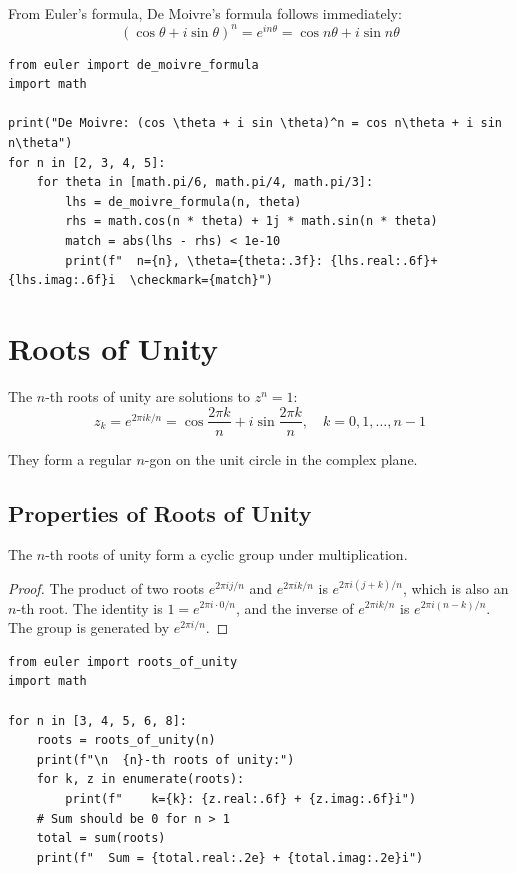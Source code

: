 From Euler's formula, De Moivre's formula follows immediately:
\[
(\cos \theta + i \sin \theta)^n = e^{in\theta} = \cos n\theta + i \sin n\theta
\]

\begin{lstlisting}[caption={De Moivre's formula}, label=lst:demoivre]
from euler import de_moivre_formula
import math

print("De Moivre: (cos \theta + i sin \theta)^n = cos n\theta + i sin n\theta")
for n in [2, 3, 4, 5]:
    for theta in [math.pi/6, math.pi/4, math.pi/3]:
        lhs = de_moivre_formula(n, theta)
        rhs = math.cos(n * theta) + 1j * math.sin(n * theta)
        match = abs(lhs - rhs) < 1e-10
        print(f"  n={n}, \theta={theta:.3f}: {lhs.real:.6f}+{lhs.imag:.6f}i  \checkmark={match}")
\end{lstlisting}

\section{Roots of Unity}

The $n$-th roots of unity are solutions to $z^n = 1$:
\[
z_k = e^{2\pi i k / n} = \cos \frac{2\pi k}{n} + i \sin \frac{2\pi k}{n}, \quad k = 0, 1, \ldots, n-1
\]

They form a regular $n$-gon on the unit circle in the complex plane.

\subsection{Properties of Roots of Unity}

\begin{theorem}
The $n$-th roots of unity form a cyclic group under multiplication.
\end{theorem}

\begin{proof}
The product of two roots $e^{2\pi i j/n}$ and $e^{2\pi i k/n}$ is $e^{2\pi i (j+k)/n}$,
which is also an $n$-th root. The identity is $1 = e^{2\pi i \cdot 0/n}$, and the inverse
of $e^{2\pi i k/n}$ is $e^{2\pi i (n-k)/n}$. The group is generated by $e^{2\pi i/n}$.
\end{proof}

\begin{lstlisting}[caption={Roots of unity}, label=lst:roots_unity]
from euler import roots_of_unity
import math

for n in [3, 4, 5, 6, 8]:
    roots = roots_of_unity(n)
    print(f"\n  {n}-th roots of unity:")
    for k, z in enumerate(roots):
        print(f"    k={k}: {z.real:.6f} + {z.imag:.6f}i")
    # Sum should be 0 for n > 1
    total = sum(roots)
    print(f"  Sum = {total.real:.2e} + {total.imag:.2e}i")
\end{lstlisting}

